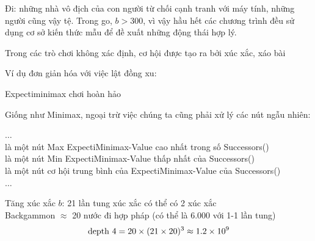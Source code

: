 \documentclass{article}
\begin{document}
\begin{huge}
Đi: những nhà vô địch của con người từ chối cạnh tranh với máy tính, những người cũng vậy
tệ. Trong go, $b > 300$, vì vậy hầu hết các chương trình đều sử dụng cơ sở kiến thức mẫu để
đề xuất những động thái hợp lý.





\vspace*{0.3in}

\maxfigwidth
{}





Trong các trò chơi không xác định, cơ hội được tạo ra bởi xúc xắc, xáo bài

Ví dụ đơn giản hóa với việc lật đồng xu:

\vspace*{0.3in}

\textwidth
{}



{\sc Expectiminimax} chơi hoàn hảo

Giống như {\sc Minimax}, ngoại trừ việc chúng ta cũng phải xử lý các nút ngẫu nhiên:

$\ldots$\\
  là một nút {\sc Max} \nl
    {\sc ExpectiMinimax-Value} cao nhất trong số {\sc Successors}()\\
  là một nút {\sc Min} \nl
    {\sc ExpectiMinimax-Value} thấp nhất của {\sc Successors}()\\
  là một nút cơ hội \nl
    trung bình của {\sc ExpectiMinimax-Value} của {\sc Successors}()\\
$\ldots$


Tăng xúc xắc $b$: 21 lần tung xúc xắc có thể có 2 xúc xắc\\
Backgammon $\approx$ 20 nước đi hợp pháp (có thể là 6.000 với 1-1 lần tung)
\[
{\rm depth}\ 4 = 20 \times (21 \times 20)^3 \approx 1.2\times 10^9
\]


\end{huge}
\end{document}

